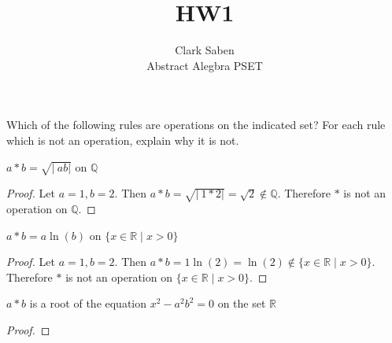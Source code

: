 \documentclass[12pt]{article}
\newenvironment{problem}[2][Problem]{\begin{trivlist}
\item[\hskip \labelsep {\bfseries #1}\hskip \labelsep {\bfseries #2.}]}{\end{trivlist}}
\newenvironment{question}[2][Question]{\begin{trivlist}
\item[\hskip \labelsep {\bfseries #1}\hskip \labelsep {\bfseries #2.}]}{\end{trivlist}}
\begin{document}
 
 
\title{HW1}%
\author{Clark Saben\\ %
Abstract Alegbra PSET} %
 
\maketitle

\begin{problem}{1/1}
	Which of the following rules are operations on the indicated set?
	For each rule which is not an operation, explain why it is not.
\end{problem}

\begin{question}{A1}
	$a*b = \sqrt{\lvert\ ab \rvert}$ on $\mathbb{Q}$
\end{question}

\begin{proof}
	Let $a = 1, b = 2$. Then $a*b = \sqrt{\lvert\ 1*2 \rvert} = \sqrt{2} \notin \mathbb{Q}$. Therefore $*$ is not an operation on $\mathbb{Q}$.
\end{proof}

    
\begin{question}{A2}
	$a*b = a\ln(b)$ on $\{x \in \mathbb{R} \mid x > 0\}$
\end{question}

\begin{proof}
	Let $a = 1, b = 2$. Then $a*b = 1\ln(2) = \ln(2) \notin \{x \in \mathbb{R} \mid x > 0\}$. Therefore $*$ is not an operation on $\{x \in \mathbb{R} \mid x > 0\}$.

\end{proof}

    
\begin{question}{A3}
	$a*b$ is a root of the equation $x^2 - a^2b^2 = 0$ on the set $\mathbb{R}$
\end{question}

\begin{proof}

\end{proof}


 
 
\end{document}

